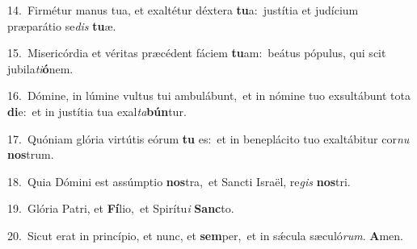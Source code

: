 {\numbfont\textcolor{\numbcolor}{14.}}~Firmétur manus tua, et exaltétur déxtera \textbf{tu}\-a:~\star justítia et judícium præparátio se\textit{dis} \textbf{tu}\-æ.\par
{\numbfont\textcolor{\numbcolor}{15.}}~Misericórdia et véritas præcédent fáciem \textbf{tu}\-am:~\star beátus pópulus, qui scit jubila\-\textit{ti}\-\textbf{ó}nem.\par
{\numbfont\textcolor{\numbcolor}{16.}}~Dómine, in lúmine vultus tui ambulábunt,~\dagger et in nómine tuo exsultábunt tota \textbf{di}\-e:~\star et in justítia tua exal\-\textit{ta}\-\textbf{bún}tur.\par
{\numbfont\textcolor{\numbcolor}{17.}}~Quóniam glória virtútis eórum \textbf{tu} es:~\star et in beneplácito tuo exaltábitur cor\textit{nu} \textbf{nos}\-trum.\par
{\numbfont\textcolor{\numbcolor}{18.}}~Quia Dómini est assúmptio \textbf{nos}\-tra,~\star et Sancti Israël, re\textit{gis} \textbf{nos}\-tri.\par
{\numbfont\textcolor{\numbcolor}{19.}}~Glória Patri, et \textbf{Fí}\-lio,~\star et Spirítu\textit{i} \textbf{Sanc}\-to.\par
{\numbfont\textcolor{\numbcolor}{20.}}~Sicut erat in princípio, et nunc, et \textbf{sem}\-per,~\star et in sǽcula sæculó\-\textit{rum}\-. \textbf{A}\-men.\par
